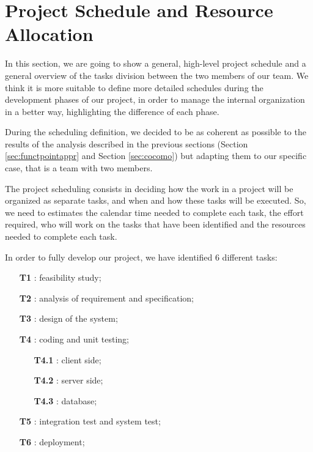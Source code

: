 \section{Project Schedule and Resource Allocation} \label{sec:psara}


In this section, we are going to show a general, high-level project schedule and a general overview of the tasks division between the two members of our team. We think it is more suitable to define more detailed schedules during the development phases of our project, in order to manage the internal organization in a better way, highlighting the difference of each phase.

During the scheduling definition, we decided to be as coherent as possible to the results of the analysis described in the previous sections (Section \ref{sec:functpointappr} and Section \ref{sec:cocomo}) but adapting them to our specific case, that is a team with two members.

The project scheduling consists in deciding how the work in a project will be organized as separate tasks, and when and how these tasks will be executed.
So, we need to estimates the calendar time needed to complete each task, the effort required, who will work on the tasks that have been identified and the resources needed to complete each task.

In order to fully develop our project, we have identified $6$ different tasks:

\begin{itemize}

\item[\textbf{T1}]: feasibility study;

\item[\textbf{T2}]: analysis of requirement and specification;

\item[\textbf{T3}]: design of the system;

\item[\textbf{T4}]: coding and unit testing;

\begin{itemize}

\item[\textbf{T4.1}]: client side;

\item[\textbf{T4.2}]: server side;

\item[\textbf{T4.3}]: database;

\end{itemize}

\item[\textbf{T5}]: integration test and system test;

\item[\textbf{T6}]: deployment;

\end{itemize}

